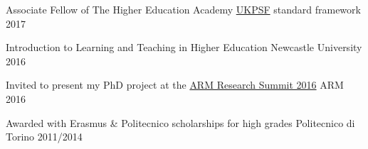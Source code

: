 
\begin{cvhonors}


\cvhonor
{Associate Fellow of The Higher Education Academy} %
{{\color{myblue}\href{https://www.heacademy.ac.uk/ukpsf}{UKPSF}} standard 
framework} %
{} %
{2017} %

\cvhonor
{Introduction to Learning and Teaching in Higher Education}
{Newcastle University}
{}
{2016}

\cvhonor
{Invited to present my PhD project at the 
{\color{myblue}\href{https://developer.arm.com/research/summit/previous-summits/2016/speakers}{ARM
 Research Summit 2016}}}
{ARM}
{}
{2016}

\cvhonor
{Awarded with Erasmus \& Politecnico scholarships for high grades}
{Politecnico di Torino}
{}
{2011/2014}


\end{cvhonors}